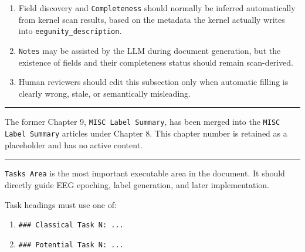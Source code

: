 \begin{tcolorbox}
\smallskip{}\par\smallskip

\begin{enumerate}[leftmargin=1.5em,noitemsep,topsep=2pt]
\item Field discovery and \texttt{Completeness} should normally be inferred automatically from kernel scan results, based on the metadata the kernel actually writes into \texttt{eegunity\_description}.
\item \texttt{Notes} may be assisted by the LLM during document generation, but the existence of fields and their completeness status should remain scan-derived.
\item Human reviewers should edit this subsection only when automatic filling is clearly wrong, stale, or semantically misleading.
\end{enumerate}

\medskip{}
\par\nopagebreak\noindent\rule{\linewidth}{0.4pt}\par\smallskip

\noindent The former Chapter 9, \texttt{MISC Label Summary}, has been merged into the \texttt{MISC Label Summary} articles under Chapter 8. This chapter number is retained as a placeholder and has no active content.\par\smallskip

\medskip{}
\par\nopagebreak\noindent\rule{\linewidth}{0.4pt}\par\smallskip

\smallskip{}\par\smallskip

\noindent \texttt{Tasks Area} is the most important executable area in the document. It should directly guide EEG epoching, label generation, and later implementation.\par\smallskip

\smallskip{}\par\smallskip

\noindent Task headings must use one of:\par\smallskip

\begin{enumerate}[leftmargin=1.5em,noitemsep,topsep=2pt]
\item \texttt{\#\#\# Classical Task N: ...}
\item \texttt{\#\#\# Potential Task N: ...}
\end{enumerate}


\end{tcolorbox}
